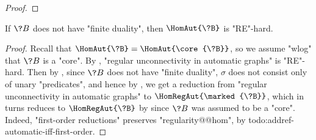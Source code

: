 \begin{proof}
\end{proof}


\begin{corollary}
	\AP\label{coro:lowerbound-homreg}
	If $\?B$ does not have "finite duality", then $\HomAut{\?B}$
	is "RE"-hard.
\end{corollary}

\begin{proof}
	Recall that $\HomAut{\?B} = \HomAut{\core{\?B}}$, so we assume "wlog"
	that $\?B$ is a "core".
	By ,
	"regular unconnectivity in automatic graphs" is "RE"-hard.
	Then by , since $\?B$ does not have "finite
	duality", $\sigma$ does not consist only of unary "predicates",
	and hence by , we get
	a reduction from "regular unconnectivity in automatic graphs" to
	$\HomRegAut{\marked{\?B}}$, which in turns
	reduces to $\HomRegAut{\?B}$ by 
	since $\?B$ was assumed to be a "core".
	Indeed, "first-order reductions" preserves "regularity@@hom", by 
	todo:addref-automatic-iff-first-order.
\end{proof}